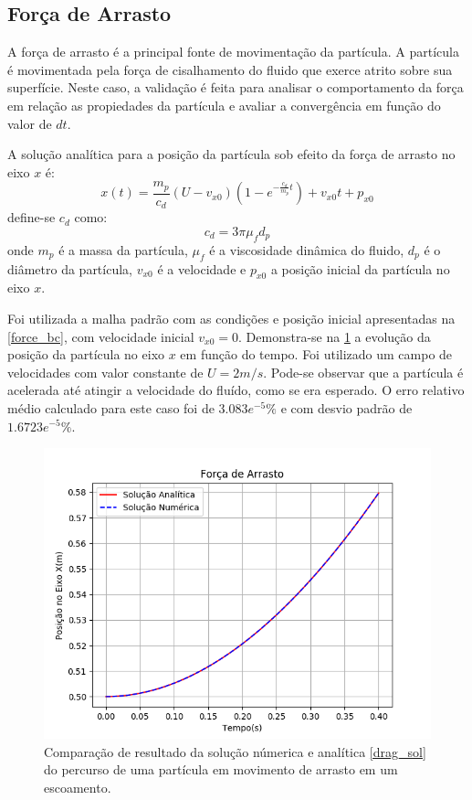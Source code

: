 \subsection{\textbf{Força de Arrasto}}
\label{sec_drag}
A força de arrasto é a principal fonte de movimentação da partícula.
A partícula é movimentada pela força de cisalhamento do fluido que exerce atrito sobre sua superfície. 
Neste caso, a validação é feita para analisar o comportamento da força em relação as propiedades da partícula e avaliar a convergência em função do valor de $dt$.

A solução analítica para a posição da partícula sob efeito da força de arrasto no eixo $x$ é:
\begin{equation}
    x(t) = \dfrac{m_p}{c_{d}} (U - v_{x0}) \left(1 - e^{-\frac{c_{d}}{m_p}t}\right) + v_{x0}t + p_{x0}
    \label{drag_sol} 
\end{equation}
define-se $c_{d}$ como:
\begin{equation}
    c_d = 3 \pi \mu_f d_p
    \label{drag_c} 
\end{equation}
onde $m_p$ é a massa da partícula, $\mu_f$ é a viscosidade dinâmica do fluido, $d_p$ é o diâmetro da partícula, $v_{x0}$ é a velocidade e $p_{x0}$ a posição inicial da partícula no eixo $x$.

Foi utilizada a malha padrão com as condições e posição inicial apresentadas na \ref{force_bc}, com velocidade inicial $v_{x0}=0$.
Demonstra-se na \ref{drag_comp} a evolução da posição da partícula no eixo $x$ em função do tempo.
Foi utilizado um campo de velocidades com valor constante de $U=2m/s$.
Pode-se observar que a partícula é acelerada até atingir a velocidade do fluído, como se era esperado.
O erro relativo médio calculado para este caso foi de $3.083e^{-5}\%$ e com desvio padrão de $1.6723e^{-5}\%$.
\begin{figure}[H]
    \centering
    \includegraphics[width=.7\linewidth]{figures/Forces_drag_validation.png}
    \caption{Comparação de resultado da solução númerica e analítica \ref{drag_sol} do percurso de uma partícula em movimento de arrasto em um escoamento.}
    \label{drag_comp}
\end{figure}

